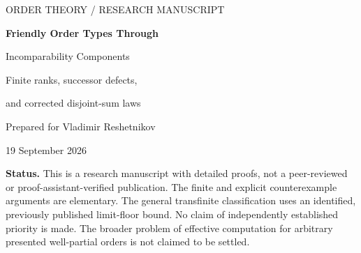 \documentclass[11pt,a4paper]{article}
\theoremstyle{definition}
\theoremstyle{remark}
\DeclareMathOperator{\fot}{f}
\newcommand{\smallstatus}[1]{\par\noindent\colorbox{Pale}{\parbox{\dimexpr\linewidth-2\fboxsep\relax}{\small #1}}\par}
\begin{document}
\hypersetup{pageanchor=false}
\begin{titlepage}
\vspace*{13mm}
{\color{Olive}\large ORDER THEORY / RESEARCH MANUSCRIPT\par}
\vspace{9mm}
{\huge\bfseries\color{Ink}Friendly Order Types Through\par
Incomparability Components\par}
\vspace{5mm}
{\Large Finite ranks, successor defects,\par and corrected disjoint-sum laws\par}
\vspace{10mm}
{\large Prepared for Vladimir Reshetnikov\par}
{\normalsize 19 September 2026\par}
\vspace{10mm}
\begin{abstract}
The friendly order type of a well-partial order is the rank of its tree of bad
sequences whose successive choices retain an incomparable witness. We attack
the problem of computing this invariant structurally and compositionally.
For every finite poset $P$, we prove
\[
\fot(P)=|P|-c(P),
\]
where $c(P)$ is the number of connected components of its incomparability
graph. The proof gives an optimal witness sequence and a polynomial-time
algorithm. For an infinite incomparability-connected well-partial order, we
prove that the friendly order type is either its maximal order type or, when
that type is a successor, its immediate predecessor. A canonical finite
upper tail and a saturation test on the remaining core decide between the
two cases. This yields exact disjoint-sum laws, including equality with
maximal order type whenever both summands are infinite.

We also give a direct counterexample to a disjoint-sum identity printed in a
2023 paper. More strongly, two explicit countable orders have identical
maximal order type, height, width, and friendly order type, but adjoining an
incomparable singleton gives different friendly order types. Thus those four
invariants do not support a general disjoint-sum calculation. The archive
includes independent finite-rank and graph implementations, checked on all
101,660 naturally labeled posets with at most seven vertices.
\end{abstract}
\vfill
\smallstatus{\textbf{Status.} This is a research manuscript with detailed proofs,
not a peer-reviewed or proof-assistant-verified publication. The finite and
explicit counterexample arguments are elementary. The general transfinite
classification uses an identified, previously published limit-floor bound.
No claim of independently established priority is made. The broader problem
of effective computation for arbitrary presented well-partial orders is not
claimed to be settled.}
\end{titlepage}
\hypersetup{pageanchor=true}
\tableofcontents
\newpage
{}
\end{document}
